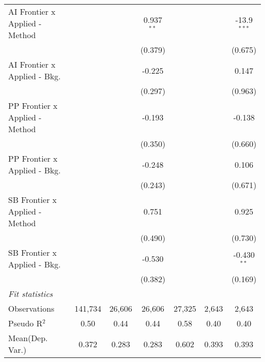 \begin{tabular}{lcccccc}
   AI Frontier x Applied - Method &               &              & 0.937$^{**}$   &               &              & -13.9$^{***}$\\   
                                  &               &              & (0.379)        &               &              & (0.675)\\   
   AI Frontier x Applied - Bkg.   &               &              & -0.225         &               &              & 0.147\\   
                                  &               &              & (0.297)        &               &              & (0.963)\\   
   PP Frontier x Applied - Method &               &              & -0.193         &               &              & -0.138\\   
                                  &               &              & (0.350)        &               &              & (0.660)\\   
   PP Frontier x Applied - Bkg.   &               &              & -0.248         &               &              & 0.106\\   
                                  &               &              & (0.243)        &               &              & (0.671)\\   
   SB Frontier x Applied - Method &               &              & 0.751          &               &              & 0.925\\   
                                  &               &              & (0.490)        &               &              & (0.730)\\   
   SB Frontier x Applied - Bkg.   &               &              & -0.530         &               &              & -0.430$^{**}$\\   
                                  &               &              & (0.382)        &               &              & (0.169)\\   
   \midrule
   \emph{Fit statistics}\\
   Observations                   & 141,734       & 26,606       & 26,606         & 27,325        & 2,643        & 2,643\\  
   Pseudo R$^2$                   & 0.50          & 0.44         & 0.44           & 0.58          & 0.40         & 0.40\\  
Mean(Dep. Var.) & 0.372 & 0.283 & 0.283 & 0.602 & 0.393 & 0.393 \\
   

\end{tabular}
